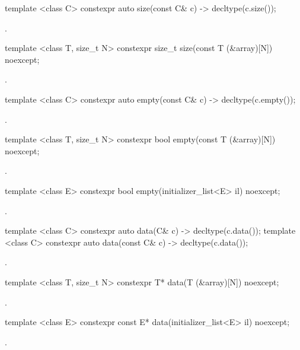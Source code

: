 \begin{itemdecl}
template <class C> constexpr auto size(const C& c) -> decltype(c.size());
\end{itemdecl}
\begin{itemdescr}
\pnum \returns {}.
\end{itemdescr}

\begin{itemdecl}
template <class T, size_t N> constexpr size_t size(const T (&array)[N]) noexcept;
\end{itemdecl}
\begin{itemdescr}
\pnum \returns {}.
\end{itemdescr}

\begin{itemdecl}
template <class C> constexpr auto empty(const C& c) -> decltype(c.empty());
\end{itemdecl}
\begin{itemdescr}
\pnum \returns {}.
\end{itemdescr}

\begin{itemdecl}
template <class T, size_t N> constexpr bool empty(const T (&array)[N]) noexcept;
\end{itemdecl}
\begin{itemdescr}
\pnum \returns {}.
\end{itemdescr}

\begin{itemdecl}
template <class E> constexpr bool empty(initializer_list<E> il) noexcept;
\end{itemdecl}
\begin{itemdescr}
\pnum \returns {}.
\end{itemdescr}

\begin{itemdecl}
template <class C> constexpr auto data(C& c) -> decltype(c.data());
template <class C> constexpr auto data(const C& c) -> decltype(c.data());
\end{itemdecl}
\begin{itemdescr}
\pnum \returns {}.
\end{itemdescr}

\begin{itemdecl}
template <class T, size_t N> constexpr T* data(T (&array)[N]) noexcept;
\end{itemdecl}
\begin{itemdescr}
\pnum \returns {}.
\end{itemdescr}

\begin{itemdecl}
template <class E> constexpr const E* data(initializer_list<E> il) noexcept;
\end{itemdecl}
\begin{itemdescr}
\pnum \returns {}.
\end{itemdescr}
